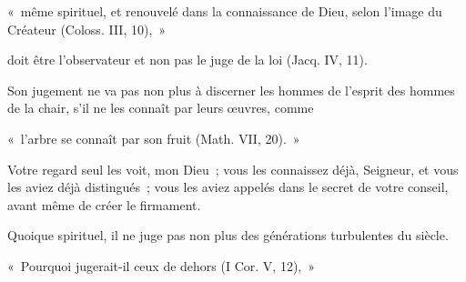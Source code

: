 \documentclass[french,twoside]{book} %
\newenvironment{quoteblock}%
  {\begin{quoting}}
  {\end{quoting}}
\newenvironment{quotebar}{%
    \def\FrameCommand{{\color{rubric!10!}\vrule width 0.5em} \hspace{0.9em}}%
    \def\OuterFrameSep{\itemsep} %
    \MakeFramed {\advance\hsize-\width \FrameRestore}
  }%
  {%
    \endMakeFramed
  }
\renewenvironment{quoteblock}%
  {%
    \savenotes
    \setstretch{0.9}
    \normalfont
    \begin{quotebar}
  }
  {%
    \end{quotebar}
    \spewnotes
  }
\begin{document}
\begin{quoteblock}
\noindent « même spirituel, et renouvelé dans la connaissance de Dieu, selon l’image du Créateur (Coloss. III, 10), »\end{quoteblock}

\noindent doit être l’observateur et non pas le juge de la loi (Jacq. IV, 11).\par
Son jugement ne va pas non plus à discerner les hommes de l’esprit des hommes de la chair, s’il ne les connaît par leurs œuvres, comme\par

\begin{quoteblock}
\noindent « l’arbre se connaît par son fruit (Math. VII, 20). »\end{quoteblock}

\noindent Votre regard seul les voit, mon Dieu ; vous les connaissez déjà, Seigneur, et vous les aviez déjà distingués ; vous les aviez appelés dans le secret de votre conseil, avant même de créer le firmament.\par
Quoique spirituel, il ne juge pas non plus des générations turbulentes du siècle.\par

\begin{quoteblock}
\noindent « Pourquoi jugerait-il ceux de dehors (I Cor. V, 12), »\end{quoteblock}
\end{document}
